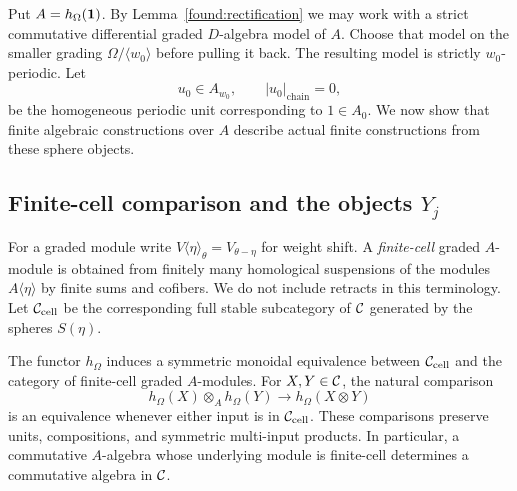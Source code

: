 Put $A=h_\Omega(\mathbf 1)$.  By Lemma~\ref{found:rectification} we may
work with a strict commutative differential graded $D$-algebra model
of $A$.  Choose that model on the smaller grading
$\Omega/\langle w_0\rangle$ before pulling it back.  The resulting
model is strictly $w_0$-periodic.  Let
\[
 u_0\in A_{w_0},\qquad |u_0|_{\mathrm{chain}}=0,
\]
be the homogeneous periodic unit corresponding to $1\in A_0$.
We now show that finite algebraic constructions over $A$ describe
actual finite constructions from these sphere objects.

\subsection{Finite-cell comparison and the objects \texorpdfstring{$Y_j$}{Yj}}

For a graded module write $V\langle\eta\rangle_\theta
=V_{\theta-\eta}$ for weight shift.  A \emph{finite-cell} graded
$A$-module is obtained from finitely many homological suspensions of
the modules $A\langle\eta\rangle$ by finite sums and cofibers.  We
do not include retracts in this terminology.  Let $\mathcal C_{\mathrm{cell}}$
be the corresponding full stable subcategory of $\mathcal C$ generated by
the spheres $S(\eta)$.

\begin{proposition}\label{found:finite-cell-morita}
The functor $h_\Omega$ induces a symmetric monoidal equivalence
between $\mathcal C_{\mathrm{cell}}$ and the category of finite-cell graded
$A$-modules.  For $X,Y\in\mathcal C$, the natural comparison
\begin{equation}\label{eq:found-tensor-comparison}
 h_\Omega(X)\otimes_A h_\Omega(Y)
       \longrightarrow h_\Omega(X\otimes Y)
\end{equation}
is an equivalence whenever either input is in $\mathcal C_{\mathrm{cell}}$.
These comparisons preserve units, compositions, and symmetric
multi-input products.  In particular, a commutative $A$-algebra whose
underlying module is finite-cell determines a commutative algebra
in $\mathcal C$.
\end{proposition}

